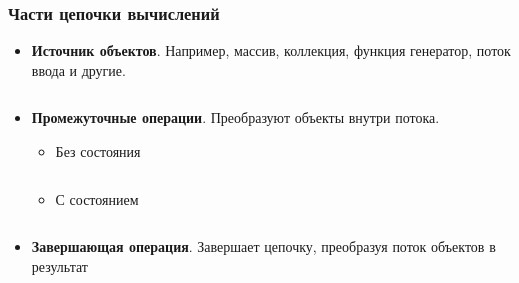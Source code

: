 \begin{frame}
\frametitle{Части цепочки вычислений} %
\begin{itemize}
	\item \textbf{Источник объектов}. Например, массив, коллекция, функция генератор, поток ввода и другие.
	\inputminted{java}{code/Producer.java}
	\item \textbf{Промежуточные операции}. Преобразуют объекты внутри потока.
	\begin{itemize}
		\item Без состояния
		\inputminted{java}{code/Stateless.java}
		\item С состоянием
		\inputminted{java}{code/Stateful.java}
	\end{itemize}
	\item \textbf{Завершающая операция}. Завершает цепочку, преобразуя поток объектов в результат
	\inputminted{java}{code/Termination.java}
\end{itemize}
\end{frame}
